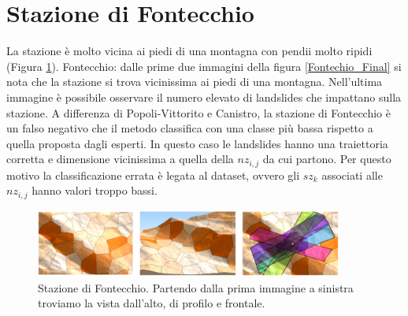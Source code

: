 \newpage
\section{Stazione di Fontecchio}
La stazione è molto vicina ai piedi di una montagna con pendii molto ripidi (Figura \ref{Fontecchio_Final}).
Fontecchio: dalle prime due immagini della figura \ref{Fontechio_Final} si nota che la stazione si trova vicinissima  ai piedi di una montagna. Nell'ultima immagine è possibile osservare il numero elevato di landslides che impattano sulla stazione. A differenza di Popoli-Vittorito e Canistro, la stazione di Fontecchio è un falso negativo che il metodo classifica con una classe più bassa rispetto a quella proposta dagli esperti. In questo caso le landslides hanno una traiettoria corretta e dimensione vicinissima a quella della $nz_{i,j}$ da cui partono. Per questo motivo la classificazione errata è legata al dataset, ovvero gli $sz_k$ associati alle $nz_{i,j}$ hanno valori troppo bassi.
	\begin{figure}[h]
		\centering
		\includegraphics[width=0.9\textwidth]{images/FontecchioFinal}
		\caption{Stazione di Fontecchio. Partendo dalla prima immagine a sinistra  troviamo la vista dall'alto, di profilo e frontale.}
		\label{Fontecchio_Final}
	\end{figure}

